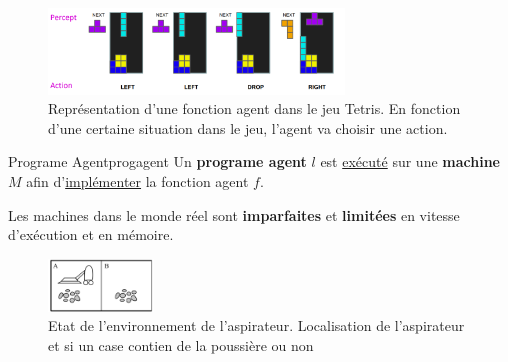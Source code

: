 \begin{example}\leavevmode
    \begin{figure}[H]
        \centering
        \includegraphics[width=0.7\textwidth]{./pictures/agent_func.png}
        \caption{Représentation d'une fonction agent dans le jeu Tetris. 
        En fonction d'une certaine situation dans le jeu, l'agent va choisir une action.}
        \label{fig:agent} 
    \end{figure}
\end{example}

\begin{definition}{Programe Agent}{progagent}
    Un \textbf{programe agent} $l$ est \underline{exécuté} sur une \textbf{machine} $M$ 
    afin d'\underline{implémenter} la fonction agent $f$.
\end{definition}
\begin{remark}\leavevmode
    Les machines dans le monde réel sont \textbf{imparfaites} et \textbf{limitées} en vitesse d'exécution et en mémoire.
\end{remark}

\begin{figure}[H]
    \begin{center}
        \includegraphics[width=0.25\textwidth]{./pictures/vac_state.png}
    \end{center}
    \caption{Etat de l'environnement de l'aspirateur. Localisation de l'aspirateur et si un case contien de la poussière ou non}
    \label{fig:vac_state}
\end{figure}

